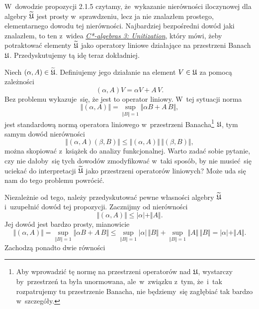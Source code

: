\documentclass[a4paper,11pt]{article}
\begin{document}
\VerSpaceFour





\noindent
{} W~dowodzie propozycji 2.1.5 czytamy, że~wykazanie nierówności
iloczynowej dla algebry $\widetilde{\mathfrak{U}}$ jest prosty w~sprawdzeniu, lecz ja nie
znalazłem prostego, elementarnego dowodu tej nierówności. Najbardziej
bezpośredni dowód jaki znalazłem, to ten z~widea
\href{https://www.youtube.com/watch?v=6NC0UWjDcBQ}{\textit{C*-algebras 3:
    Unitization}}, który mówi, żeby
potraktować elementy $\widetilde{\mathfrak{U}}$ jako operatory liniowe działające
na przestrzeni Banach $\mathfrak{U}$. Przedyskutujemy tą idę teraz dokładniej.

Niech $( \alpha, A ) \in \widetilde{\mathfrak{U}}$. Definiujemy jego działanie na element
$V \in \mathfrak{U}$ za pomocą zależności
\begin{equation}
  \label{eq:Bratteli-Robinson-Operator-Algebras-ETC-Vol-I-s01-02}
  ( \alpha, A ) V = \alpha V + A \, V.
\end{equation}
Bez problemu wykazuje~się, że jest to operator liniowy. W~tej sytuacji
norma
\begin{equation}
  \label{eq:Bratteli-Robinson-Operator-Algebras-ETC-Vol-I-s01-03}
  \Vert ( \alpha, A ) \Vert =
  \sup_{ \Vert B \Vert = 1 } \Vert \alpha B + A \, B \Vert,
\end{equation}
jest standardową normą operatora liniowego w~przestrzeni
Banacha\footnote{Aby wprowadzić tę normę na przestrzeni operatorów nad
  $\mathfrak{U}$, wystarczy by~przestrzeń ta była unormowana, ale~w~związku
  z~tym, że~i~tak rozpatrujemy tu przestrzenie Banacha, nie będziemy~się
  zagłębiać tak bardzo w~szczegóły.}
$\mathfrak{U}$, tym samym dowód nierówności
\begin{equation}
  \label{eq:Bratteli-Robinson-Operator-Algebras-ETC-Vol-I-s01-04}
  \Vert ( \alpha, A ) ( \beta, B ) \Vert \leq
  \Vert ( \alpha, A ) \Vert \, \Vert ( \beta, B ) \Vert,
\end{equation}
można skopiować z~książek do analizy funkcjonalnej. Warto zadać sobie
pytanie, czy nie dałoby~się tych dowodów zmodyfikować w~taki sposób, by nie
musieć~się uciekać do interpretacji $\widetilde{\mathfrak{U}}$ jako przestrzeni
operatorów liniowych? Może uda się nam do tego problemu powrócić.

Niezależnie od tego, należy przedyskutować pewne własności algebry
$\widetilde{\mathfrak{U}}$ i~uzupełnić dowód tej propozycji. Zacznijmy od nierówności
\begin{equation}
  \label{eq:Bratteli-Robinson-Operator-Algebras-ETC-Vol-I-s01-05}
  \Vert ( \alpha, A ) \Vert \leq | \alpha | + \Vert A \Vert.
\end{equation}
Jej dowód jest bardzo prosty, mianowicie
\begin{equation}
  \label{eq:Bratteli-Robinson-Operator-Algebras-ETC-Vol-I-s01-06}
  \Vert ( \alpha, A ) \Vert =
  \sup_{ \Vert B \Vert = 1 } \Vert \alpha B + A \, B \Vert \leq
  \sup_{ \Vert B \Vert = 1 } | \alpha | \, \Vert B \Vert +
  \sup_{ \Vert B \Vert = 1 } \Vert A \Vert \, \Vert B \Vert =
  | \alpha | + \Vert A \Vert.
\end{equation}
Zachodzą ponadto dwie równości
\end{document}
